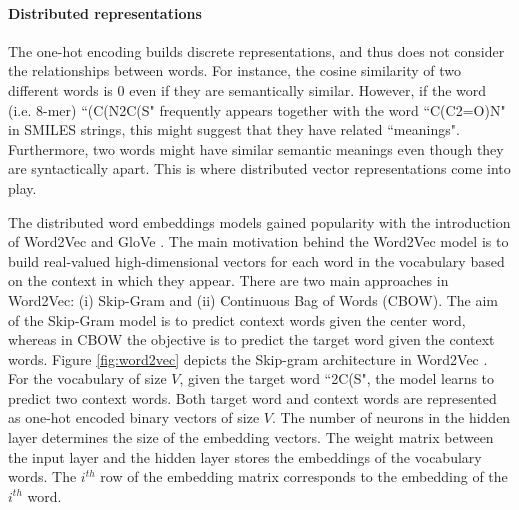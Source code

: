 \documentclass[review]{elsarticle}
\begin{document}
\paragraph{Distributed representations} %
The one-hot encoding builds discrete representations, and thus does not consider the relationships between words. For instance, the cosine similarity of two different words is 0 even if they are semantically similar. However, if the word  (i.e. $8$-mer) ``(C(N2C(S" frequently appears together with the word ``C(C2=O)N" in SMILES strings, this might suggest that they have related ``meanings". Furthermore, two words might have similar semantic meanings even though they are syntactically apart. This is where distributed vector representations come into play. 

The distributed word embeddings models gained popularity with the introduction of  Word2Vec \cite{mikolov2013distributed} and GloVe \cite{pennington2014glove}. The main motivation behind the Word2Vec model is to build real-valued high-dimensional vectors for each word in the vocabulary based on the context in which they appear. There are two main approaches in Word2Vec: (i) Skip-Gram and (ii) Continuous Bag of Words (CBOW). The aim of the Skip-Gram model is to predict context words given the center word, whereas in CBOW the objective is to predict the target word given the context words. Figure \ref{fig:word2vec} depicts the Skip-gram architecture in Word2Vec \cite{mikolov2013distributed}. For the vocabulary of size $V$, given the target word ``2C(S", the model learns to predict two context words. Both target word and context words are represented as one-hot encoded binary vectors of size $V$.  The number of neurons in the hidden layer determines the size of the embedding vectors. The weight matrix between the input layer and the hidden layer stores the embeddings of the vocabulary words. The $i^{th}$ row of the embedding matrix corresponds to the embedding of the $i^{th}$ word. 

\end{document}
